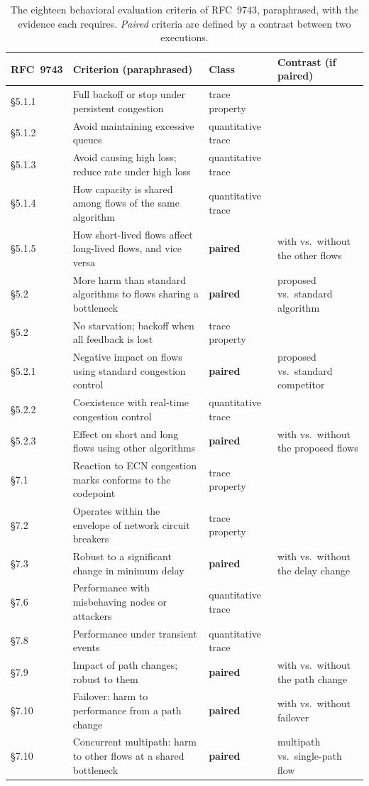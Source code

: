 \documentclass[sigconf,review,anonymous]{acmart}
\begin{document}
	\begin{table}[t]
		\caption{The eighteen behavioral evaluation criteria of RFC~9743, paraphrased, with the evidence each requires. \emph{Paired} criteria are defined by a contrast between two executions.}
		\label{tab:audit}
		\centering
		\scriptsize
		\begin{tabular}{@{}llll@{}}
			\toprule
			RFC~9743 & Criterion (paraphrased) & Class & Contrast (if paired) \\
			\midrule
			\S5.1.1 & Full backoff or stop under persistent congestion & trace property & \\
			\S5.1.2 & Avoid maintaining excessive queues & quantitative trace & \\
			\S5.1.3 & Avoid causing high loss; reduce rate under high loss & quantitative trace & \\
			\S5.1.4 & How capacity is shared among flows of the same algorithm & quantitative trace & \\
			\S5.1.5 & How short-lived flows affect long-lived flows, and vice versa & \textbf{paired} & with vs.\ without the other flows \\
			\S5.2 & More harm than standard algorithms to flows sharing a bottleneck & \textbf{paired} & proposed vs.\ standard algorithm \\
			\S5.2 & No starvation; backoff when all feedback is lost & trace property & \\
			\S5.2.1 & Negative impact on flows using standard congestion control & \textbf{paired} & proposed vs.\ standard competitor \\
			\S5.2.2 & Coexistence with real-time congestion control & quantitative trace & \\
			\S5.2.3 & Effect on short and long flows using other algorithms & \textbf{paired} & with vs.\ without the proposed flows \\
			\S7.1 & Reaction to ECN congestion marks conforms to the codepoint & trace property & \\
			\S7.2 & Operates within the envelope of network circuit breakers & trace property & \\
			\S7.3 & Robust to a significant change in minimum delay & \textbf{paired} & with vs.\ without the delay change \\
			\S7.6 & Performance with misbehaving nodes or attackers & quantitative trace & \\
			\S7.8 & Performance under transient events & quantitative trace & \\
			\S7.9 & Impact of path changes; robust to them & \textbf{paired} & with vs.\ without the path change \\
			\S7.10 & Failover: harm to performance from a path change & \textbf{paired} & with vs.\ without failover \\
			\S7.10 & Concurrent multipath: harm to other flows at a shared bottleneck & \textbf{paired} & multipath vs.\ single-path flow \\
			\bottomrule
		\end{tabular}
	\end{table}
	
\end{document}

